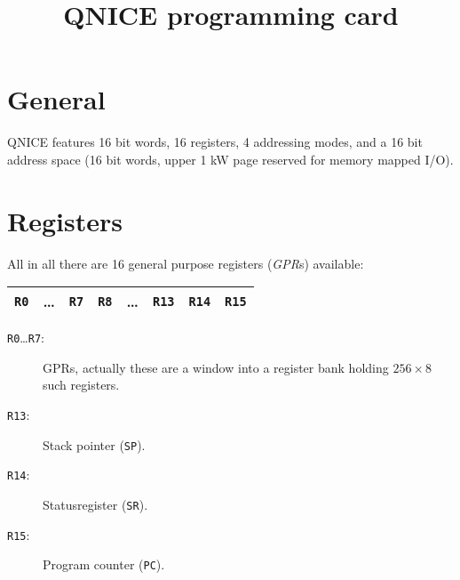 \documentclass{leaflet}
\begin{document}
 \title{QNICE programming card}
 \maketitle
%
 \section{General}
  QNICE features 16 bit words, 16 registers, 4 addressing modes, and 
  a 16 bit address space (16 bit words, upper 1 kW page reserved for
  memory mapped I/O).
  \vspace*{-5mm}
%
 \section{Registers}
  All in all there are 16 general purpose registers (\emph{GPR}s) available:
  \begin{center}
   \vspace*{-2mm}
   \begin{longtable}{|c|c|c||c|c|c|c|c|}
    \hline
    {\tt R0}&\dots&{\tt R7}&{\tt R8}&\dots&{\tt R13}&{\tt R14}&{\tt R15}\\
    \hline
   \end{longtable}
   \vspace*{-9mm}
  \end{center}
  \begin{description}
   \item [\texttt{R0}\dots\texttt{R7}:] GPRs, actually 
    these are a window into a register bank holding $256\times 8$ such 
    registers.
   \item [\texttt{R13}:] Stack pointer (\texttt{SP}).
   \item [\texttt{R14}:] Statusregister (\texttt{SR}).
   \item [\texttt{R15}:] Program counter (\texttt{PC}).
  \end{description}
%
\end{document}
